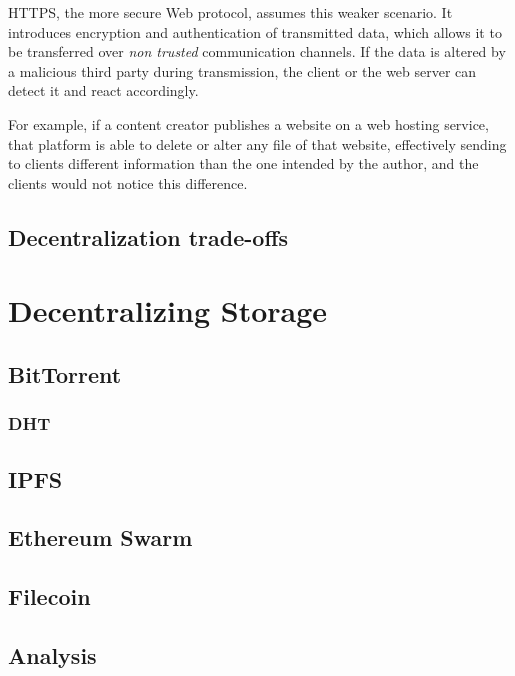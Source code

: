 \documentclass[mscthesis]{usiinfthesis}
\begin{document}
HTTPS, the more secure Web protocol, assumes this weaker scenario. It introduces encryption and authentication of transmitted data, which allows it to be transferred over \textit{non trusted} communication channels. If the data is altered by a malicious third party during transmission, the client or the web server can detect it and react accordingly.

For example, if a content creator publishes a website on a web hosting service, that platform is able to delete or alter any file of that website, effectively sending to clients different information than the one intended by the author, and the clients would not notice this difference.


\section{Decentralization trade-offs}

\chapter{Decentralizing Storage}

\section{BitTorrent}\label{proj:bittorrent}

\subsection{DHT}\label{tech:dht}

\section{IPFS}\label{proj:ipfs}

\section{Ethereum Swarm}\label{proj:swarm}

\section{Filecoin}\label{proj:filecoin}

\section{Analysis}
\end{document}
